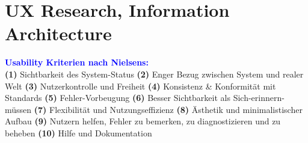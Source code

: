 
\section{UX Research, Information Architecture}

\textbf{\textcolor{blue}{Usability Kriterien nach Nielsens:}}\\
\textbf{(1)} Sichtbarkeit des System-Status \textbf{(2)} Enger Bezug zwischen System und realer Welt \textbf{(3)} Nutzerkontrolle und Freiheit \textbf{(4)} Konsistenz \& Konformität mit Standards \textbf{(5)} Fehler-Vorbeugung \textbf{(6)} Besser Sichtbarkeit als Sich-erinnern-müssen \textbf{(7)} Flexibilität und Nutzungseffizienz \textbf{(8)} Ästhetik und minimalistischer Aufbau \textbf{(9)} Nutzern helfen, Fehler zu bemerken, zu diagnostizieren und zu beheben \textbf{(10)} Hilfe und Dokumentation
